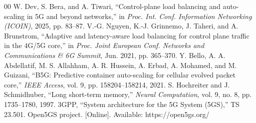 \documentclass[conference]{IEEEtran}
\begin{document}
\begin{thebibliography}{00}
 W. Dev, S. Bera, and A. Tiwari, ``Control-plane load balancing and auto-scaling in 5G and beyond networks,'' in \emph{Proc. Int. Conf. Information Networking (ICOIN)}, 2025, pp. 83--87.
 V.-G. Nguyen, K.-J. Grinnemo, J. Taheri, and A. Brunstrom, ``Adaptive and latency-aware load balancing for control plane traffic in the 4G/5G core,'' in \emph{Proc. Joint European Conf. Networks and Communications \& 6G Summit}, Jun. 2021, pp. 365--370.
 Y. Bello, A. A. Abdellatif, M. S. Allahham, A. R. Hussein, A. Erbad, A. Mohamed, and M. Guizani, ``B5G: Predictive container auto-scaling for cellular evolved packet core,'' \emph{IEEE Access}, vol. 9, pp. 158204--158214, 2021.
 S. Hochreiter and J. Schmidhuber, ``Long short-term memory,'' \emph{Neural Computation}, vol. 9, no. 8, pp. 1735--1780, 1997.
 3GPP, ``System architecture for the 5G System (5GS),'' TS 23.501.
 Open5GS project. [Online]. Available: https://open5gs.org/
\end{thebibliography}
\end{document}
